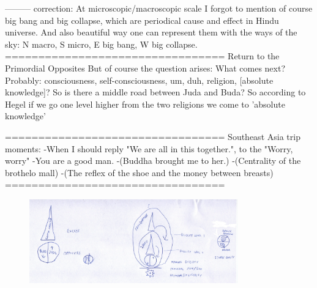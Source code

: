 \documentclass[10pt]{book}
\begin{document}
---------
correction:
At microscopic/macroscopic scale I forgot to mention of course big bang and big collapse, which are periodical cause and effect in Hindu universe. And also beautiful way one can represent them with the ways of the sky: N macro, S micro, E big bang, W big collapse.
=================================
Return to the Primordial Opposites
But of course the question arises: What comes next? Probably: consciousness, self-consciousness, um, duh, religion, [absolute knowledge]?
So is there a middle road between Juda and Buda?
So according to Hegel if we go one level higher from the two religions we come to 'absolute knowledge'

=================================
Southeast Asia trip moments:
-When I should reply "We are all in this together.", to the "Worry, worry"
-You are a good man.
-(Buddha brought me to her.)
-(Centrality of the brothelo mall)
-(The reflex of the shoe and the money between breasts)
=================================

\begin{figure}[ht!]
\centering
\includegraphics[width=90mm]{scan00.jpg}
\label{overflow}
\end{figure}
\end{document}

